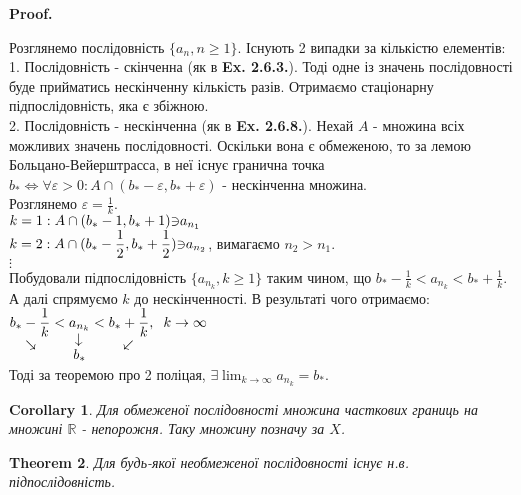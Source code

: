 \documentclass[a4paper, 14pt]{article}
\makeatletter
\def\qed{$\blacksquare$}
\theoremstyle{theoremdd}
\newtheorem{theorem}{Theorem}[subsection]
\theoremstyle{theoremdd}
\theoremstyle{theoremdd}
\theoremstyle{theoremdd}
\theoremstyle{theoremdd}
\theoremstyle{theoremdd}
\theoremstyle{theoremdd}
\theoremstyle{theoremdd}
\newtheorem{corollary}[theorem]{Corollary}
\renewenvironment{proof}[1][Proof.\\]{\par
\pushQED{\hfill \qed}%
\normalfont \topsep6\p@\@plus6\p@\relax
\trivlist
\item\relax
{\bfseries
#1\@addpunct{.}}\hspace\labelsep\ignorespaces
}{%
\popQED\endtrivlist\@endpefalse
}
\makeatother
\begin{document}
	\begin{proof}
	Розглянемо послідовність $\{a_n, n \geq 1\}$. Існують 2 випадки за кількістю елементів:\\
	1. Послідовність - скінченна (як в \textbf{Ex. 2.6.3.}). Тоді одне із значень послідовності буде прийматись нескінченну кількість разів. Отримаємо стаціонарну підпослідовність, яка є збіжною.
	\bigskip \\
	2. Послідовність - нескінченна (як в \textbf{Ex. 2.6.8.}). Нехай $A$ - множина всіх можливих значень послідовності. Оскільки вона є обмеженою, то за лемою Больцано-Вейерштрасса, в неї існує гранична точка $b_* \iff \forall \varepsilon > 0:A \cap (b_*-\varepsilon, b_*+\varepsilon)$ - нескінченна множина.\\
	Розглянемо $\varepsilon = \displaystyle \frac{1}{k}$.\\
	$\displaystyle k = 1: A \cap(b_*-1, b_*+1) \rotatebox[origin=c]{180}{$\in$}a_{n_1}$\\
	$\displaystyle k = 2: A \cap(b_*-\frac{1}{2}, b_*+\frac{1}{2}) \rotatebox[origin=c]{180}{$\in$}a_{n_2}$, вимагаємо $n_2>n_1$.\\
	$\vdots$\\
	Побудовали підпослідовність $\{a_{n_k}, k \geq 1\}$ таким чином, що $\displaystyle b_*-\frac{1}{k} < a_{n_k} < b_*+\frac{1}{k}$.\\
	А далі спрямуємо $k$ до нескінченності. В результаті чого отримаємо:\\
	$\displaystyle \underset{\rotatebox[origin=c]{-45}{$\rightarrow$}}{b_*-\frac{1}{k}} < \underset{\underset{\displaystyle b_*}{\rotatebox[origin=c]{90}{$\leftarrow$}}}{a_{n_k}} < \underset{\rotatebox[origin=c]{45}{$\leftarrow$}}{b_*+\frac{1}{k}}, \hspace{0.2cm} k \to \infty$\\
	Тоді за теоремою про 2 поліцая, $\displaystyle \exists \lim_{k \to \infty} a_{n_k} = b_*$.
	\end{proof}
	
	\begin{corollary}
	Для обмеженої послідовності множина часткових границь на множині $\mathbb{R}$ - непорожня. Таку множину позначу за $X$.
	\end{corollary}
		
	\begin{theorem} Для будь-якої необмеженої послідовності існує н.в. підпослідовність.
	\end{theorem}
	
\end{document}
